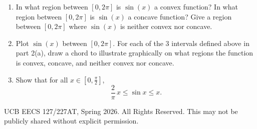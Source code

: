\documentclass[10pt]{article}
\begin{document}
\begin{enumerate}[label=(\alph*)]
    \item In what region between $[0, 2\pi]$ is $\sin(x)$ a convex function? In what region between $[0, 2\pi]$ is $\sin(x)$ a concave function? Give a region between $[0, 2\pi]$ where $\sin(x)$ is neither convex nor concave.

    \item Plot $\sin(x)$ between $[0, 2\pi]$. For each of the 3 intervals defined above in part 2(a), draw a chord to illustrate graphically on what regions the function is convex, concave, and neither convex nor concave.

    \item Show that for all $x \in [0, \frac{\pi}{2}]$,
    \begin{equation}
        \frac{2}{\pi}\, x \leq \sin x \leq x.
    \end{equation}
\end{enumerate}

\vfill
\noindent\small\textcopyright{} UCB EECS 127/227AT, Spring 2026. All Rights Reserved. This may not be publicly shared without explicit permission.
\end{document}
